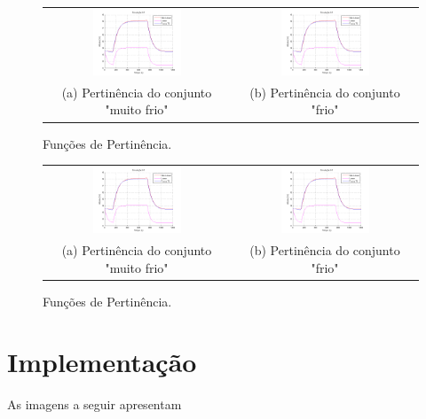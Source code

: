 \begin{figure}[H]
	\centering
	\begin{tabular}{cc}
		\includegraphics[width=0.5\textwidth,keepaspectratio]{img/FM_h1_5_10_15.png} &
		\includegraphics[width=0.5\textwidth,keepaspectratio]{img/FM_h1_5_10_15.png} \\
		(a) Pertinência do conjunto "muito frio" &
		(b) Pertinência do conjunto "frio"
	\end{tabular}
	\caption{\label{imgTS5} Funções de Pertinência.}
\end{figure}

\begin{figure}[H]
	\centering
	\begin{tabular}{cc}
		\includegraphics[width=0.5\textwidth,keepaspectratio]{img/FM_h1_5_10_15.png} &
		\includegraphics[width=0.5\textwidth,keepaspectratio]{img/FM_h1_5_10_15.png} \\
		(a) Pertinência do conjunto "muito frio" &
		(b) Pertinência do conjunto "frio"
	\end{tabular}
	\caption{\label{imgTS15} Funções de Pertinência.}
\end{figure}

\section{Implementação}
As imagens a seguir apresentam 
%

